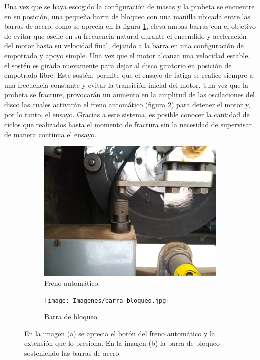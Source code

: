 Una vez que se haya escogido la configuración de masas y la probeta se encuentre en su posición, una pequeña barra de bloqueo con una manilla ubicada entre las barras de acero, como se aprecia en la figura \ref{fig:freno_auto}, eleva ambas barras con el objetivo de evitar que oscile en su frecuencia natural durante el encendido y aceleración del motor hasta su velocidad final, dejando a la barra en una configuración de empotrado y apoyo simple. Una vez que el motor alcanza una velocidad estable, el sostén es girado nuevamente para dejar al disco giratorio en posición de empotrado-libre. Este sostén, permite que el ensayo de fatiga se realice siempre a una frecuencia constante y evitar la transición inicial del motor. Una vez que la probeta se fracture, provocarán un aumento en la amplitud de las oscilaciones del disco las cuales activarán el freno automático (figura \ref{fig:barra_bloqueo}) para detener el motor y, por lo tanto, el ensayo. Gracias a este sistema, es posible conocer la cantidad de ciclos que realizados hasta el momento de fractura sin la necesidad de supervisar de manera continua el ensayo.

\begin{figure}[h]
\centering
	\begin{subfigure}{0.55\linewidth}
		\centering
		\includegraphics[width=\linewidth]{Imagenes/freno_automatico.jpg}
		\caption{Freno automático.}\label{fig:freno_auto}
	\end{subfigure}
	\begin{subfigure}{0.365\linewidth}
		\centering
		\texttt{[image: Imagenes/barra\_bloqueo.jpg]}
		\caption{Barra de bloqueo.}\label{fig:barra_bloqueo}
	\end{subfigure}%
\caption{En la imagen (a) se aprecia el botón del freno automático y la extensión que lo presiona. En la imagen (b) la barra de bloqueo sosteniendo las barras de acero.}
\label{fig:barra_freno}
\end{figure}

